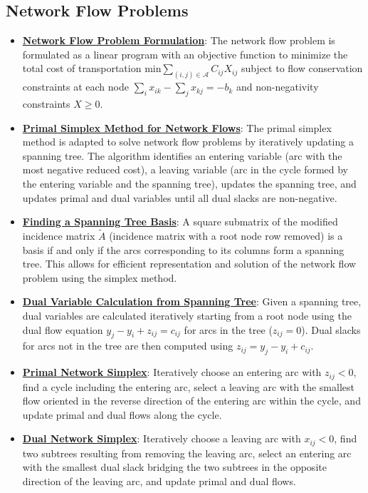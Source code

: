 \documentclass{article}%
\begin{document}
%
\subsection{Network Flow Problems}%
\label{subsec:NetworkFlowProblems}%
\begin{itemize}[leftmargin=*]%
\item \href{https://www.math.purdue.edu/~yipn/421//2024-11-05-NetFlows.pdf#page=2}{\textbf{Network Flow Problem Formulation}}: The network flow problem is formulated as a linear program with an objective function to minimize the total cost of transportation $\text{min} \sum_{(i,j) \in \mathcal{A}} C_{ij} X_{ij}$ subject to flow conservation constraints at each node $\sum_{i} x_{ik} - \sum_{j} x_{kj} = -b_k$ and non-negativity constraints $X \ge 0$.%
\item \href{https://www.math.purdue.edu/~yipn/421//2024-11-05-NetFlows.pdf#page=22}{\textbf{Primal Simplex Method for Network Flows}}: The primal simplex method is adapted to solve network flow problems by iteratively updating a spanning tree.  The algorithm identifies an entering variable (arc with the most negative reduced cost), a leaving variable (arc in the cycle formed by the entering variable and the spanning tree), updates the spanning tree, and updates primal and dual variables until all dual slacks are non-negative.%
\item \href{https://www.math.purdue.edu/~yipn/421//2024-11-05-NetFlows.pdf#page=15}{\textbf{Finding a Spanning Tree Basis}}: A square submatrix of the modified incidence matrix $\tilde{A}$ (incidence matrix with a root node row removed) is a basis if and only if the arcs corresponding to its columns form a spanning tree.  This allows for efficient representation and solution of the network flow problem using the simplex method.%
\item \href{https://www.math.purdue.edu/~yipn/421//2024-11-05-NetFlows.pdf#page=18}{\textbf{Dual Variable Calculation from Spanning Tree}}: Given a spanning tree, dual variables are calculated iteratively starting from a root node using the dual flow equation $y_j - y_i + z_{ij} = c_{ij}$ for arcs in the tree ($z_{ij} = 0$).  Dual slacks for arcs not in the tree are then computed using $z_{ij} = y_j - y_i + c_{ij}$.%
\item \href{https://www.math.purdue.edu/~yipn/421//2024-11-07-NetSimplex.pdf#page=5}{\textbf{Primal Network Simplex}}: Iteratively choose an entering arc with $z_{ij} < 0$, find a cycle including the entering arc, select a leaving arc with the smallest flow oriented in the reverse direction of the entering arc within the cycle, and update primal and dual flows along the cycle.%
\item \href{https://www.math.purdue.edu/~yipn/421//2024-11-07-NetSimplex.pdf#page=32}{\textbf{Dual Network Simplex}}: Iteratively choose a leaving arc with $x_{ij} < 0$, find two subtrees resulting from removing the leaving arc, select an entering arc with the smallest dual slack bridging the two subtrees in the opposite direction of the leaving arc, and update primal and dual flows.%
\end{itemize}
\end{document}
